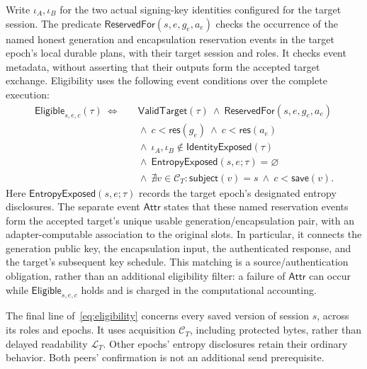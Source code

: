 Write $\iota_A,\iota_B$ for the two actual signing-key identities configured
for the target session.  The predicate
$\mathsf{ReservedFor}(s,e,g_e,a_e)$ checks the occurrence of the named honest
generation and encapsulation reservation events in the target epoch's local
durable plans, with their target session and roles.  It checks event metadata,
without asserting that their outputs form the accepted target exchange.
Eligibility uses the following event conditions over the complete execution:
\begin{align}
 \mathsf{Eligible}_{s,e,c}(\tau)\ \Longleftrightarrow\quad&
 \mathsf{ValidTarget}(\tau)
 \ \wedge\ \mathsf{ReservedFor}(s,e,g_e,a_e)
 \nonumber\\[-1mm]
 &{}\wedge\ c<\mathsf{res}(g_e)
          \ \wedge\ c<\mathsf{res}(a_e)
 \nonumber\\
 &{}\wedge\ \iota_A,\iota_B
                  \notin\mathsf{IdentityExposed}(\tau)
 \nonumber\\
 &{}\wedge\ \mathsf{EntropyExposed}(s,e;\tau)=\varnothing
 \nonumber\\
 &{}\wedge\ \nexists v\in\mathcal C_T:
       \mathsf{subject}(v)=s\ \wedge\ c<\mathsf{save}(v).
 \label{eq:eligibility}
\end{align}
Here $\mathsf{EntropyExposed}(s,e;\tau)$ records the target epoch's designated
entropy disclosures.  The separate event $\mathsf{Attr}$ states that these
named reservation events form the accepted target's unique usable
generation/encapsulation pair, with an adapter-computable association to the
original slots.  In particular, it connects the generation public key, the
encapsulation input, the authenticated response, and the target's subsequent
key schedule.  This matching is a
source/authentication obligation, rather than an additional eligibility
filter: a failure of $\mathsf{Attr}$ can occur while
$\mathsf{Eligible}_{s,e,c}$ holds and is charged in the computational
accounting.

The final line of~\eqref{eq:eligibility} concerns every saved version of session
$s$, across its roles and epochs.  It uses acquisition
$\mathcal C_T$, including protected bytes, rather than delayed readability
$\mathcal L_T$.  Other epochs' entropy disclosures retain their ordinary
behavior.  Both peers' confirmation is not an additional send prerequisite.

